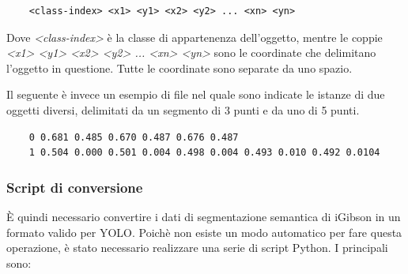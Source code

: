 \documentclass[12pt]{report}
\begin{document}
\begin{verbatim}
	<class-index> <x1> <y1> <x2> <y2> ... <xn> <yn>
\end{verbatim}

Dove \textit{<class-index>} è la classe di appartenenza dell'oggetto, mentre le coppie \textit{<x1> <y1> <x2> <y2> ... <xn> <yn>} sono le coordinate che delimitano l'oggetto in questione. Tutte le coordinate sono separate da uno spazio.

Il seguente è invece un esempio di file nel quale sono indicate le istanze di due oggetti diversi, delimitati da un segmento di 3 punti e da uno di 5 punti.

\begin{verbatim}
	0 0.681 0.485 0.670 0.487 0.676 0.487
	1 0.504 0.000 0.501 0.004 0.498 0.004 0.493 0.010 0.492 0.0104
\end{verbatim}

\subsubsection{Script di conversione}
\label{sec:script_di_conversione_igibson}

È quindi necessario convertire i dati di segmentazione semantica di iGibson in un formato valido per YOLO. Poichè non esiste un modo automatico per fare questa operazione, è stato necessario realizzare una serie di script Python. I principali sono:
\end{document}
